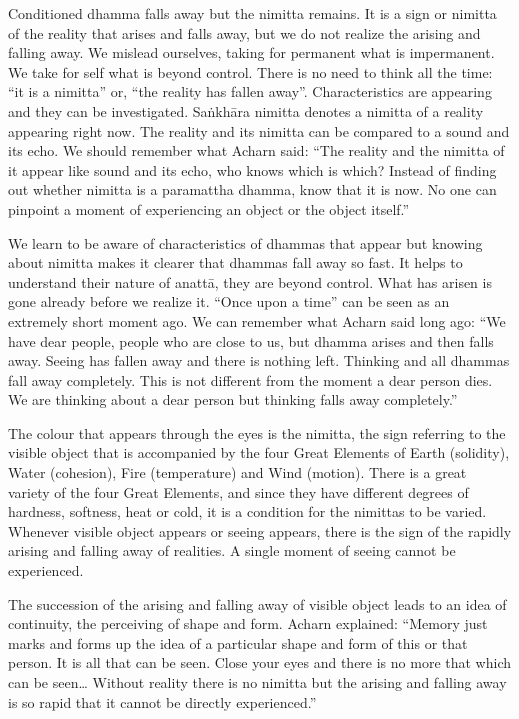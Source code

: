 Conditioned dhamma falls away but the nimitta remains. It is a sign or
nimitta of the reality that arises and falls away, but we do not realize
the arising and falling away. We mislead ourselves, taking for permanent
what is impermanent. We take for self what is beyond control. There is
no need to think all the time: ``it is a nimitta'' or, ``the reality has
fallen away''. Characteristics are appearing and they can be
investigated. Saṅkhāra nimitta denotes a nimitta of a reality appearing
right now. The reality and its nimitta can be compared to a sound and
its echo. We should remember what Acharn said: ``The reality and the
nimitta of it appear like sound and its echo, who knows which is which?
Instead of finding out whether nimitta is a paramattha dhamma, know that
it is now. No one can pinpoint a moment of experiencing an object or the
object itself.''

We learn to be aware of characteristics of dhammas that appear but
knowing about nimitta makes it clearer that dhammas fall away so fast.
It helps to understand their nature of anattā, they are beyond control.
What has arisen is gone already before we realize it. ``Once upon a
time'' can be seen as an extremely short moment ago. We can remember
what Acharn said long ago: ``We have dear people, people who are close
to us, but dhamma arises and then falls away. Seeing has fallen away and
there is nothing left. Thinking and all dhammas fall away completely.
This is not different from the moment a dear person dies. We are
thinking about a dear person but thinking falls away completely.''

The colour that appears through the eyes is the nimitta, the sign
referring to the visible object that is accompanied by the four Great
Elements of Earth (solidity), Water (cohesion), Fire (temperature) and
Wind (motion). There is a great variety of the four Great Elements, and
since they have different degrees of hardness, softness, heat or cold,
it is a condition for the nimittas to be varied. Whenever visible object
appears or seeing appears, there is the sign of the rapidly arising and
falling away of realities. A single moment of seeing cannot be
experienced.

The succession of the arising and falling away of visible object leads
to an idea of continuity, the perceiving of shape and form. Acharn
explained: ``Memory just marks and forms up the idea of a particular
shape and form of this or that person. It is all that can be seen. Close
your eyes and there is no more that which can be seen\ldots{} Without
reality there is no nimitta but the arising and falling away is so rapid
that it cannot be directly experienced.''

